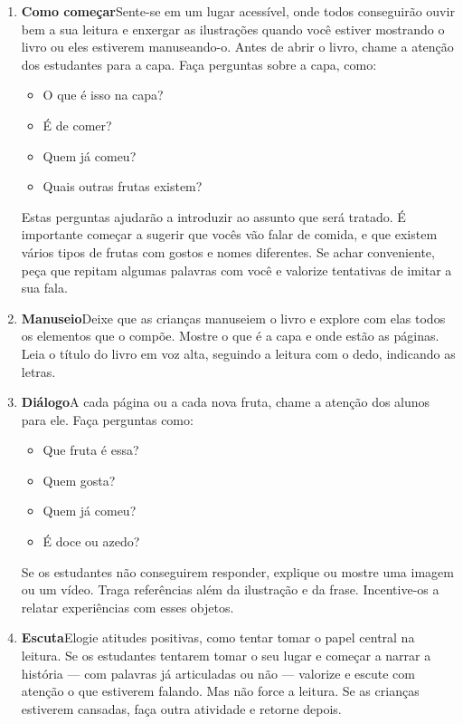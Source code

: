 \documentclass[11pt]{extarticle}
\begin{document}
\begin{enumerate}
\item \textbf{Como começar}\quad Sente-se em um lugar acessível, 
onde todos conseguirão ouvir bem a sua leitura e enxergar as ilustrações 
quando você estiver mostrando o livro ou eles estiverem manuseando-o. 
Antes de abrir o livro, chame a atenção dos estudantes para a capa. 
Faça perguntas sobre a capa, como: 

\begin{itemize}
\item O que é isso na capa?
\item É de comer?
\item Quem já comeu?
\item Quais outras frutas existem?
\end{itemize}

Estas perguntas ajudarão a introduzir ao assunto que será tratado. 
É importante começar a sugerir que vocês vão falar de comida,
e que existem vários tipos de frutas com gostos
e nomes diferentes. Se achar 
conveniente, peça que repitam algumas palavras com você e valorize tentativas 
de imitar a sua fala. 
 
\item \textbf{Manuseio}\quad Deixe que as crianças manuseiem o livro 
e explore com elas todos os elementos que o compõe. Mostre o que é a 
capa e onde estão as páginas. Leia o título do livro em voz alta, seguindo 
a leitura com o dedo, indicando as letras. 

\item \textbf{Diálogo}\quad A cada página ou a cada nova fruta,
chame a atenção dos alunos para ele. Faça perguntas como:

\begin{itemize}
\item Que fruta é essa?
\item Quem gosta?
\item Quem já comeu?
\item É doce ou azedo?
\end{itemize}

Se os estudantes não conseguirem responder, explique ou mostre uma 
imagem ou um vídeo. Traga referências além da ilustração e da frase. 
Incentive-os a relatar experiências com esses objetos.

\item \textbf{Escuta}\quad Elogie atitudes positivas, como 
tentar tomar o papel central na leitura. Se os estudantes tentarem 
tomar o seu lugar e começar a narrar a história --- com palavras já articuladas 
ou não --- valorize e escute com atenção o que estiverem falando. Mas não 
force a leitura. Se as crianças estiverem cansadas, faça outra atividade 
e retorne depois. 


\end{enumerate}
\end{document}
